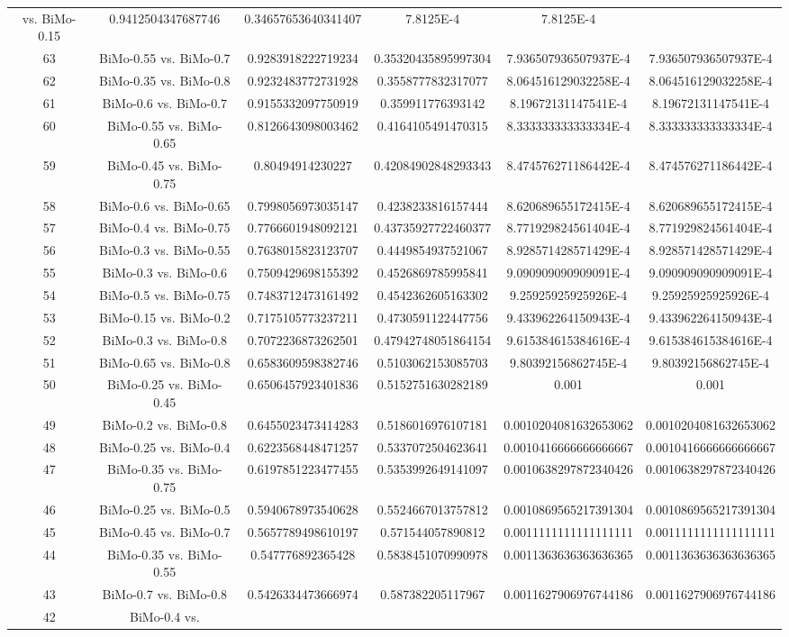 \documentclass[a4paper,10pt]{article}
\begin{document}
\begin{landscape}
\begin{table}[!htp]
\begin{tabular}{cccccc}
vs. BiMo-0.15&0.9412504347687746&0.34657653640341407&7.8125E-4&7.8125E-4\\63&BiMo-0.55 vs. BiMo-0.7&0.9283918222719234&0.35320435895997304&7.936507936507937E-4&7.936507936507937E-4\\62&BiMo-0.35 vs. BiMo-0.8&0.9232483772731928&0.3558777832317077&8.064516129032258E-4&8.064516129032258E-4\\61&BiMo-0.6 vs. BiMo-0.7&0.9155332097750919&0.359911776393142&8.19672131147541E-4&8.19672131147541E-4\\60&BiMo-0.55 vs. BiMo-0.65&0.8126643098003462&0.4164105491470315&8.333333333333334E-4&8.333333333333334E-4\\59&BiMo-0.45 vs. BiMo-0.75&0.80494914230227&0.42084902848293343&8.474576271186442E-4&8.474576271186442E-4\\58&BiMo-0.6 vs. BiMo-0.65&0.7998056973035147&0.4238233816157444&8.620689655172415E-4&8.620689655172415E-4\\57&BiMo-0.4 vs. BiMo-0.75&0.7766601948092121&0.43735927722460377&8.771929824561404E-4&8.771929824561404E-4\\56&BiMo-0.3 vs. BiMo-0.55&0.7638015823123707&0.4449854937521067&8.928571428571429E-4&8.928571428571429E-4\\55&BiMo-0.3 vs. BiMo-0.6&0.7509429698155392&0.4526869785995841&9.090909090909091E-4&9.090909090909091E-4\\54&BiMo-0.5 vs. BiMo-0.75&0.7483712473161492&0.4542362605163302&9.25925925925926E-4&9.25925925925926E-4\\53&BiMo-0.15 vs. BiMo-0.2&0.7175105773237211&0.4730591122447756&9.433962264150943E-4&9.433962264150943E-4\\52&BiMo-0.3 vs. BiMo-0.8&0.7072236873262501&0.47942748051864154&9.615384615384616E-4&9.615384615384616E-4\\51&BiMo-0.65 vs. BiMo-0.8&0.6583609598382746&0.5103062153085703&9.80392156862745E-4&9.80392156862745E-4\\50&BiMo-0.25 vs. BiMo-0.45&0.6506457923401836&0.5152751630282189&0.001&0.001\\49&BiMo-0.2 vs. BiMo-0.8&0.6455023473414283&0.5186016976107181&0.0010204081632653062&0.0010204081632653062\\48&BiMo-0.25 vs. BiMo-0.4&0.6223568448471257&0.5337072504623641&0.0010416666666666667&0.0010416666666666667\\47&BiMo-0.35 vs. BiMo-0.75&0.6197851223477455&0.5353992649141097&0.0010638297872340426&0.0010638297872340426\\46&BiMo-0.25 vs. BiMo-0.5&0.5940678973540628&0.5524667013757812&0.0010869565217391304&0.0010869565217391304\\45&BiMo-0.45 vs. BiMo-0.7&0.5657789498610197&0.571544057890812&0.0011111111111111111&0.0011111111111111111\\44&BiMo-0.35 vs. BiMo-0.55&0.547776892365428&0.5838451070990978&0.0011363636363636365&0.0011363636363636365\\43&BiMo-0.7 vs. BiMo-0.8&0.5426334473666974&0.587382205117967&0.0011627906976744186&0.0011627906976744186\\42&BiMo-0.4 vs. 
\end{tabular}
\end{table}
\end{landscape}
\end{document}
